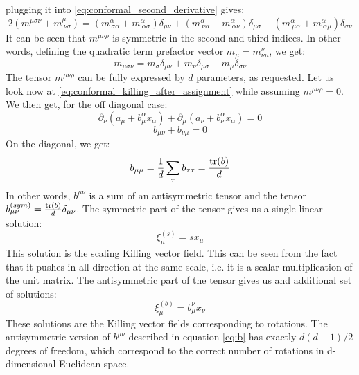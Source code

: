 \documentclass{article}
\begin{document}
plugging it into \ref{eq:conformal_second_derivative} gives:
\begin{equation}
    2\left(m^{\mu \sigma\nu} + m_{\ \nu\sigma}^{\mu}\right) =
    \left(m_{\ \sigma\alpha}^{\alpha} + m_{\ \alpha\sigma}^{\alpha}\right)\delta_{\mu\nu} +
    \left(m_{\ \nu\alpha}^{\alpha} + m_{\ \alpha\nu}^{\alpha}\right) \delta_{\mu\sigma} -
    \left(m_{\ \mu\alpha}^{\alpha} + m_{\ \alpha\mu}^{\alpha}\right) \delta_{\sigma\nu}
\end{equation}
It can be seen that $m^{\mu\nu\rho}$ is symmetric in the second and third indices. In other words, defining the quadratic term prefactor vector $m_\mu = m^\nu_{\nu\mu}$, we get:
\begin{equation}
    m_{\mu\sigma\nu} =  m_{\sigma}\delta_{\mu\nu} +
    m_\nu \delta_{\mu\sigma} -
    m_\mu \delta_{\sigma\nu}
\end{equation}
The tensor $m^{\mu\nu\rho}$ can be fully expressed by $d$ parameters, as requested. Let us look now at \ref{eq:conformal_killing_after_assignment} while assuming $m^{\mu\nu\rho} = 0$. We then get, for the off diagonal case:
\begin{equation}
    \partial_\nu \left(
        a_\mu + b_\mu^{\alpha}x_\alpha
    \right) + \partial_\mu \left(
        a_\nu + b_\nu^{\alpha}x_\alpha
    \right) = 0
\end{equation}
\begin{equation}
\label{eq:b}
    b_{\mu\nu} + b_{\nu\mu} = 0
\end{equation}
On the diagonal, we get:
\begin{equation}
    b_{\mu\mu} = \frac{1}{d}\sum_\tau b_{\tau\tau} = \frac{\tr(b)}{d}
\end{equation}
In other words, $b^{\mu\nu}$ is a sum of an antisymmetric tensor and the tensor $b^{(sym)}_{\mu\nu} = \frac{\tr(b)}{d}\delta_{\mu\nu}$. The symmetric part of the tensor gives us a single linear solution:
\begin{equation}
    \xi^{(s)}_\mu = s x_\mu
\end{equation}
This solution is the scaling Killing vector field. This can be seen from the fact that it pushes in all direction at the same scale, i.e. it is a scalar multiplication of the unit matrix.
\newline
The antisymmetric part of the tensor gives us and additional set of solutions:
\begin{equation}
    \xi^{(b)}_\mu = b_{\mu}^\nu x_\nu
\end{equation}
These solutions are the Killing vector fields corresponding to rotations. The antisymmetric version of $b^{\mu\nu}$ described in equation \ref{eq:b} has exactly $d(d-1)/2$ degrees of freedom, which correspond to the correct number of rotations in d-dimensional Euclidean space.
\end{document}
